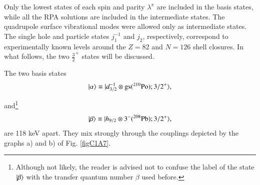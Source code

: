 Only the lowest states of each spin and parity $\lambda^{\pi}$ are included in the basis states, while all the RPA solutions are included in the intermediate states. The quadrupole surface vibrational modes were allowed only as intermediate states. The single hole and particle states $j_1^{-1}$ and $j_2$, respectively, correspond to experimentally known levels around the $Z = 82$ and $N=126$ shell closures.  
In what follows, the  two $\frac{3}{2}^+$ states will be discussed.

The two basis states 
  \begin{align}\label{eqC1A89} 
   |{\alpha} \rangle\equiv |{d_{3/2}^{-1}\otimes \text{gs}(^{210}\text{Po});3/2^+} \rangle,
    \end{align} 


and\footnote{Although not likely, the reader is advised not to confuse the label of the state $|{\beta} \rangle$ with the transfer quantum number $\beta$ used before.}
  \begin{align}\label{eqC1A90} 
      |{\beta} \rangle\equiv |{h_{9/2}\otimes 3^-(^{208}\text{Pb});3/2^+} \rangle,
    \end{align} 
are 118 keV apart. They mix strongly through the couplings depicted by the graphs a) and b) of Fig. \ref{figC1A7}. 


